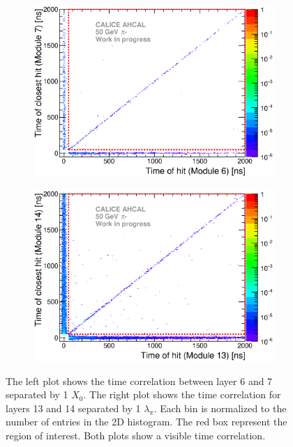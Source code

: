 \begin{figure}[htbp!]
	\begin{subfigure}[t]{0.49\textwidth}
		\centering
		\includegraphics[width=1\textwidth]{../Thesis_Plots/Timing/Pions/Plots/Time_Correlation_short.eps}
		\caption{} \label{fig:Time_Corr_short}
	\end{subfigure}
	\hfill
	\begin{subfigure}[t]{0.49\textwidth}
		\centering
		\includegraphics[width=1\textwidth]{../Thesis_Plots/Timing/Pions/Plots/Time_Correlation_long.eps}
		\caption{}\label{fig:Time_Corr_long}
	\end{subfigure}
	\caption{The left plot shows the time correlation between layer 6 and 7 separated by 1 $X_0$. The right plot shows the time correlation for layers 13 and 14 separated by 1 $\lambda_{\pi}$. Each bin is normalized to the number of entries in the 2D histogram. The red box represent the region of interest. Both plots show a visible time correlation.}
	\label{fig:TimeCorrelation}
\end{figure}
